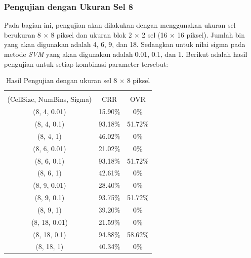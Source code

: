 \subsubsection{Pengujian dengan Ukuran Sel 8}
Pada bagian ini, pengujian akan dilakukan dengan menggunakan ukuran sel berukuran 8 $\times$ 8 piksel dan ukuran blok 2 $\times$ 2 sel (16 $\times$ 16 piksel). Jumlah bin yang akan digunakan adalah 4, 6, 9, dan 18. Sedangkan untuk nilai sigma pada metode \textit{SVM} yang akan digunakan adalah 0.01, 0.1, dan 1. Berikut adalah hasil pengujian untuk setiap kombinasi parameter tersebut:
\begin{longtable}[c]{|c|c|c|}
	\caption{Hasil Pengujian dengan ukuran sel 8 $\times$ 8 piksel}
	\label{tab:HasilPengujianSel8}\\
	\hline
	\begin{tabular}[c]{@{}c@{}}Parameter\\ (CellSize, NumBins, Sigma)\end{tabular} & CRR     & OVR     \\ \hline
	\endhead
	(8, 4, 0.01)                                                                   & 15.90\% & 0\% \\ \hline
	(8, 4, 0.1)                                                                    & 93.18\% & 51.72\%     \\ \hline
	(8, 4, 1)                                                                      & 46.02\% & 0\%     \\ \hline
	(8, 6, 0.01)                                                                   & 21.02\% & 0\%  \\ \hline
	(8, 6, 0.1)                                                                    & 93.18\% & 51.72\%     \\ \hline
	(8, 6, 1)                                                                      & 42.61\% & 0\%     \\ \hline
	(8, 9, 0.01)                                                                   & 28.40\% & 0\%  \\ \hline
	(8, 9, 0.1)                                                                    & 93.75\% & 51.72\%     \\ \hline
	(8, 9, 1)                                                                      & 39.20\% & 0\%     \\ \hline
	(8, 18, 0.01)                                                                  & 21.59\% & 0\%  \\ \hline
	(8, 18, 0.1)                                                                   & {\color[HTML]{FE0000} 94.88\%} & {\color[HTML]{FE0000} 58.62\%}     \\ \hline
	(8, 18, 1)                                                                     & 40.34\% & 0\%     \\ \hline
\end{longtable}
